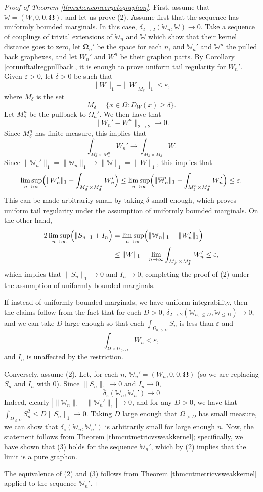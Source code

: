 \documentclass{amsart}
\numberwithin{equation}{section}
\numberwithin{figure}{section}
\theoremstyle{definition}
\theoremstyle{remark}
\newcommand{\eps}{\varepsilon}
\newcommand{\bOmega}{{\mathbf{\Omega}}}
\newcommand{\cW}{\mathbb{W}}
\newcommand{\deltt}{\delta_{2\to 2}}
\def\delGP{\delta_\diamond}
\begin{document}
\begin{proof}[Proof of Theorem \ref{thmwhenconvergetographon}]
First, assume that $\cW=(W,0,0,\bOmega)$, and let us prove (2). Assume first
that the sequence has uniformly bounded marginals. In this case,
$\deltt(\cW_n,\cW) \to 0$. Take a sequence of couplings of trivial extensions
of $\cW_n$ and $\cW$ which show that their kernel distance goes to zero, let
$\bOmega_n'$ be the space for each $n$, and $\cW_n'$ and $\cW^n$ the pulled
back graphexes, and let $W_n'$ and $W^n$ be their graphon parts. By Corollary
\ref{coruniftailregpullback}, it is enough to prove uniform tail regularity
for $W_n'$. Given $\eps>0$, let $\delta>0$ be such that
\[
\|W\|_1-\|W|_{M_\delta}\|_1\leq\eps,
\]
where $M_\delta$ is the set
\[
M_\delta=\{x \in \Omega: D_{W}(x) \ge \delta\}.
\]
Let $M_\delta^n$ be the pullback to $\Omega_n'$. We then have that
\[
\|W_n'-W^n\|_{2\to2} \to 0.
\]
Since $M_\delta^n$ has finite measure, this implies that
\[
\int_{M_\delta^n \times M_\delta^n} W_n' \to \int_{M_\delta \times M_\delta}W.
\]
Since $\|\cW_n'\|_1= \|\cW_n\|_1 \to \|\cW\|_1=\|W\|_1$, this implies that
\[
\limsup_{n\to\infty} \Bigl(\|W_n'\|_1 - \int_{M_\delta^n \times M_\delta^n} W_n'\Bigr)
\leq\limsup_{n\to\infty} \Bigl(\|\cW_n'\|_1 - \int_{M_\delta^n \times M_\delta^n} W_n'\Bigr) \le \varepsilon.
\]
This can be made arbitrarily small by taking $\delta$ small enough, which
proves uniform tail regularity under the assumption of uniformly bounded
marginals. On the other hand,
\begin{align*}
2\limsup_{n\to\infty} \Bigl(\|S_n\|_1+I_n\Bigr)&=\limsup_{n\to\infty} \Bigl(\|\cW_n\|_1-\|W_n'\|_1\Bigr)\\
&\leq \|W\|_1-\lim_{n\to\infty}\int_{M_\delta^n \times M_\delta^n} W_n'\leq\eps,
\end{align*}
which implies that $\|S_n\|_1 \to 0$ and $I_n \to 0$, completing the proof of
(2) under the assumption of uniformly bounded marginals.

If instead of uniformly bounded marginals, we have uniform integrability,
then the claims follow from the fact that for each $D>0$, $\deltt(\cW_{n,\le
D},\cW_{\le D}) \to 0$, and we can take $D$ large enough so that each
$\int_{\Omega_{n,>D}}S_{n}$ is less than $\varepsilon$ and
\[
\int_{\Omega \times \Omega_{>D}} W_n < \varepsilon ,\] and $I_n$ is unaffected
by the restriction.

Conversely, assume (2). Let, for each $n$, $\cW_n'=(W_n,0,0,\bOmega)$ (so we
are replacing $S_n$ and $I_n$ with $0$). Since $\|S_n\|_1 \to 0$ and $I_n \to
0$,
\[\delGP(\cW_n,\cW_n') \to 0
\]
Indeed, clearly $|\|\cW_n\|_1 - \|\cW_n'\|_1| \to 0$, and for any $D>0$, we
have that $\int_{\Omega_{\le D}} S_n^2 \le D\|S_n\|_1 \to 0$. Taking $D$
large enough that $\Omega_{>D}$ has small measure, we can show that
$\delGP(\cW_n,\cW_n')$ is arbitrarily small for large enough $n$. Now, the
statement follows from Theorem \ref{thmcutmetricvsweakkernel}; specifically,
we have shown that (3) holds for the sequence $\cW_n'$, which by (2) implies
that the limit is a pure graphon.

The equivalence of (2) and (3) follows from Theorem
\ref{thmcutmetricvsweakkernel} applied to the sequence $\cW_n'$.
\end{proof}
\end{document}
